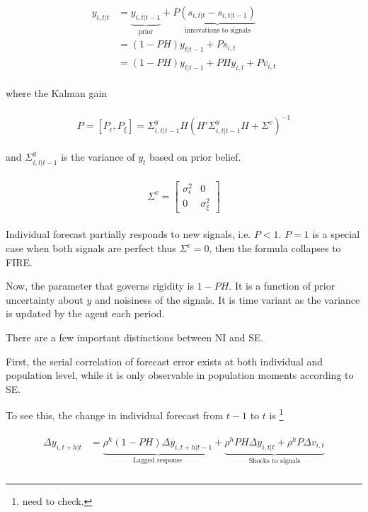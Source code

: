 \documentclass[]{article}
\begin{document}
	
	\begin{eqnarray}
		\begin{aligned}
			y_{i,t|t}  
			& =  \underbrace{y_{i,t|t-1}}_{\text{prior}} + P \underbrace {(s_{i,t|t}-s_{i,t|t-1})}_{\text{innovations to signals}} \\
			& = (1-PH) y_{t|t-1} + Ps_{i,t} \\
			& = (1-PH) y_{t|t-1} + PH y_{i,t} + P v_{i,t} 
		\end{aligned}
	\end{eqnarray}
	
	where the Kalman gain  
	
	
	\begin{eqnarray}
		\begin{aligned}
			P = [P_\epsilon,P_\xi]= \Sigma^y_{i,t|t-1} H(H'\Sigma^y_{i,t|t-1} H + \Sigma^v)^{-1} 
		\end{aligned}
	\end{eqnarray}
	
	and $\Sigma^y_{i,t|t-1}$  is the variance of  $y_t$ based on prior belief.
	
	\begin{eqnarray}
		\begin{aligned}
			\Sigma^v =  \left[ \begin{matrix} 
				\sigma^2_{\epsilon} &  0 \\ 
				0 & \sigma^2_\xi \end{matrix}\right] 
		\end{aligned}
	\end{eqnarray}
	
	Individual forecast partially responds to new signals, i.e. $P<1$. $P=1$ is a special case when both signals are perfect thus $\Sigma^v = 0$, then the formula collapses to FIRE. 
	
	Now, the parameter that governs rigidity is $1-PH$. It is a function of prior uncertainty about $y$ and noisiness of the signals. It is time variant as the variance is updated by the agent each period.  
	
	There are a few important distinctions between NI and SE. 
	
	First, the serial correlation of forecast error exists at both individual and population level, while it is only observable in population moments according to SE. 
	
	To see this, the change in individual forecast from $t-1$ to $t$ is \footnote{need to check.}
	
	\begin{eqnarray}
		\begin{aligned}
			\Delta y_{i,t+h|t} & = \underbrace{\rho^h (1-PH)\Delta y_{i,t+h|t-1}}_{\text{Lagged response}} + \underbrace{\rho^hPH \Delta y_{i,t|t} + \rho^h P\Delta v_{i,t}}_{\text{Shocks to signals}}\\
		\end{aligned}
	\end{eqnarray}
	
\end{document}
